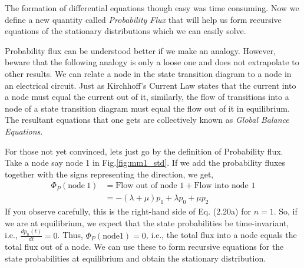\documentclass[11pt, a4paper]{report}
\begin{document}
The formation of differential equations though easy was time consuming. Now we define a new quantity called \emph{Probability Flux} that will help us form recursive equations of the stationary distributions which we can easily solve. 


Probability flux can be understood better if we make an analogy. However, beware that the following analogy is only a loose one and does not extrapolate to other results. We can relate a node in the state transition diagram to a node in an electrical circuit. Just as Kirchhoff's Current Law states that the current into a node must equal the current out of it, similarly, the flow of transitions into a node of a state transition diagram must equal the flow out of it in equilibrium. The resultant equations that one gets are collectively known as \emph{Global Balance Equations}.

For those not yet convinced, lets just go by the definition of Probability flux. Take a node say node 1 in Fig.\ref{fig:mm1_std}. If we add the probability fluxes together with the signs representing the direction, we get,
\begin{align}
    \Phi_P(\text{node}\ 1) &= \text{Flow out of node } 1 + \text{Flow into node } 1\\
    &= -(\lambda + \mu) p_1 + \lambda p_0 + \mu p_2
\end{align}
If you observe carefully, this is the right-hand side of Eq. (2.20a) for $n = 1$. So, if we are at equilibrium, we expect that the state probabilities be time-invariant, i.e., $\frac{dp_n(t)}{dt} = 0$. Thus, $\Phi_P(\text{node} 1) = 0$, i.e., the total flux into a node equals the total flux out of a node.
We can use these to form recursive equations for the state probabilities at equilibrium and obtain the stationary distribution.
\end{document}
